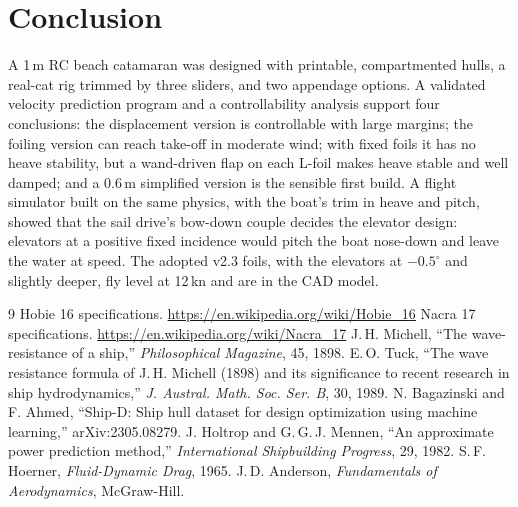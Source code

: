 \documentclass[10pt,twocolumn]{article}
\begin{document}
\section{Conclusion}
A 1\,m RC beach catamaran was designed with printable, compartmented hulls, a real-cat rig trimmed by three sliders, and two appendage options. A validated velocity prediction program and a controllability analysis support four conclusions: the displacement version is controllable with large margins; the foiling version can reach take-off in moderate wind; with fixed foils it has no heave stability, but a wand-driven flap on each L-foil makes heave stable and well damped; and a 0.6\,m simplified version is the sensible first build. A flight simulator built on the same physics, with the boat's trim in heave and pitch, showed that the sail drive's bow-down couple decides the elevator design: elevators at a positive fixed incidence would pitch the boat nose-down and leave the water at speed. The adopted v2.3 foils, with the elevators at $-0.5^\circ$ and slightly deeper, fly level at 12\,kn and are in the CAD model.

\begin{thebibliography}{9}\small
{} Hobie 16 specifications. \url{https://en.wikipedia.org/wiki/Hobie_16}
 Nacra 17 specifications. \url{https://en.wikipedia.org/wiki/Nacra_17}
 J.\,H. Michell, ``The wave-resistance of a ship,'' \emph{Philosophical Magazine}, 45, 1898.
 E.\,O. Tuck, ``The wave resistance formula of J.\,H. Michell (1898) and its significance to recent research in ship hydrodynamics,'' \emph{J. Austral. Math. Soc. Ser. B}, 30, 1989.
 N. Bagazinski and F. Ahmed, ``Ship-D: Ship hull dataset for design optimization using machine learning,'' arXiv:2305.08279.
 J. Holtrop and G.\,G.\,J. Mennen, ``An approximate power prediction method,'' \emph{International Shipbuilding Progress}, 29, 1982.
 S.\,F. Hoerner, \emph{Fluid-Dynamic Drag}, 1965.
 J.\,D. Anderson, \emph{Fundamentals of Aerodynamics}, McGraw-Hill.
\end{thebibliography}
\end{document}
